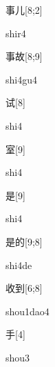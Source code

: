 \begin{verbete}[shir4]{事儿}[8;2]
\begin{pronuncia}{shir4}
\end{pronuncia}
\end{verbete}

\begin{verbete}[shi4gu4]{事故}[8;9]
\begin{pronuncia}{shi4gu4}
\end{pronuncia}
\end{verbete}

\begin{verbete}[shi4]{试}[8]
\begin{pronuncia}{shi4}
\end{pronuncia}
\end{verbete}

\begin{verbete}[shi4]{室}[9]
\begin{pronuncia}{shi4}
\end{pronuncia}
\end{verbete}

\begin{verbete}[shi4]{是}[9]
\begin{pronuncia}{shi4}
\end{pronuncia}
\end{verbete}

\begin{verbete}[shi4de]{是的}[9;8]
\begin{pronuncia}{shi4de}
\end{pronuncia}
\end{verbete}

\begin{verbete}{收到}[6;8]
\begin{pronuncia}{shou1dao4}
\end{pronuncia}
\end{verbete}

\begin{verbete}[shou3]{手}[4]
\begin{pronuncia}{shou3}
\end{pronuncia}
\end{verbete}

